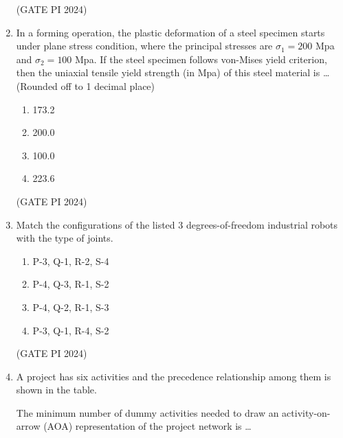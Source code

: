 \documentclass[journal,12pt,onecolumn]{IEEEtran}
\theoremstyle{remark}
\begin{document}
\begin{enumerate}
\hfill (GATE PI 2024)

\item In a forming operation, the plastic deformation of a steel specimen starts under plane stress condition, where the principal stresses are $\sigma_1=200$ Mpa and $\sigma_2=100$ Mpa. If the steel specimen follows von-Mises yield criterion, then the uniaxial tensile yield strength (in Mpa) of this steel material is \dots (Rounded off to 1 decimal place)

\begin{multicols}{4}
\begin{enumerate}
\item 173.2
\item 200.0
\item 100.0
\item 223.6
\end{enumerate}
\end{multicols}

\hfill (GATE PI 2024)

\item Match the configurations of the listed 3 degrees-of-freedom industrial robots with the type of joints.



\begin{enumerate}
\item P-3, Q-1, R-2, S-4
\item P-4, Q-3, R-1, S-2
\item P-4, Q-2, R-1, S-3
\item P-3, Q-1, R-4, S-2
\end{enumerate}


\hfill (GATE PI 2024)

\item A project has six activities and the precedence relationship among them is shown in the table.


 The minimum number of dummy activities needed to draw an activity-on-arrow (AOA) representation of the project network is \dots

\begin{enumerate}
\end{enumerate}


\end{enumerate}
\end{document}
